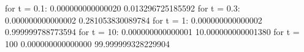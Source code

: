 \documentclass{article}
\begin{document}
\begin{enumerate}
for t = 0.1:
   0.000000000000020
   0.013296725185592
\newline
for t = 0.3:
   0.000000000000002
   0.281053830089784
\newline
for t = 1:
   0.000000000000002
   0.999999788773594
\newline
for t = 10:
   0.000000000000001
  10.000000000001380
\newline
for t = 100
   0.000000000000000
  99.999999328229904
   














    
    

\end{enumerate}
\end{document}
